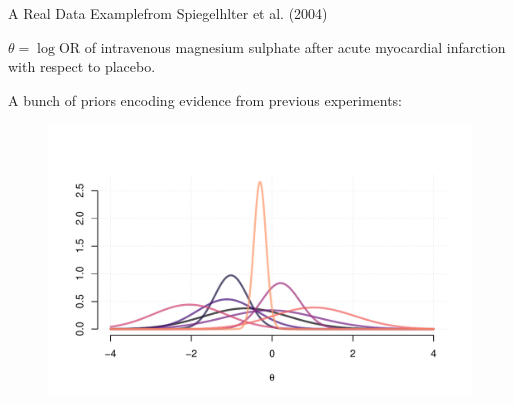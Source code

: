 \documentclass[9 pt]{beamer}
\begin{document}
\begin{frame}{A Real Data Example}{from Spiegelhlter et al. (2004)}

$\theta = \log \text{OR}$ of intravenous magnesium sulphate after acute myocardial infarction with respect to placebo.

\vspace{0.25cm}

\pause

A bunch of priors encoding evidence from previous experiments:

\begin{figure}
    \centering
    \includegraphics[width = .91\textwidth]{images/plot_mix1.pdf}
\end{figure}
    



\end{frame}
\end{document}
